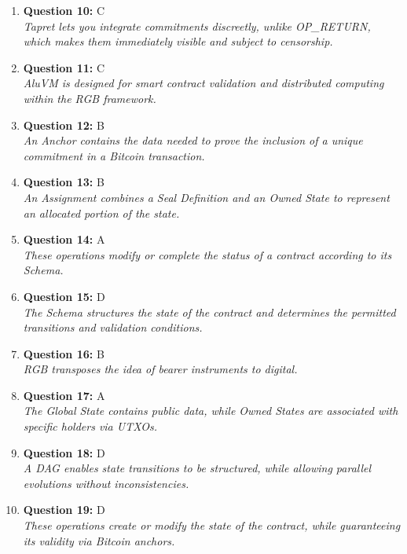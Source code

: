 \documentclass[12pt,a4paper]{article}
\begin{document}
\begin{enumerate}
\item \textbf{Question 10:} C
\\ \textit{Tapret lets you integrate commitments discreetly, unlike OP\_RETURN, which makes them immediately visible and subject to censorship.}

\item \textbf{Question 11:} C
\\ \textit{AluVM is designed for smart contract validation and distributed computing within the RGB framework.}

\item \textbf{Question 12:} B
\\ \textit{An Anchor contains the data needed to prove the inclusion of a unique commitment in a Bitcoin transaction.}

\item \textbf{Question 13:} B
\\ \textit{An Assignment combines a Seal Definition and an Owned State to represent an allocated portion of the state.}

\item \textbf{Question 14:} A
\\ \textit{These operations modify or complete the status of a contract according to its Schema.}

\item \textbf{Question 15:} D
\\ \textit{The Schema structures the state of the contract and determines the permitted transitions and validation conditions.}

\item \textbf{Question 16:} B
\\ \textit{RGB transposes the idea of bearer instruments to digital.}

\item \textbf{Question 17:} A
\\ \textit{The Global State contains public data, while Owned States are associated with specific holders via UTXOs.}

\item \textbf{Question 18:} D
\\ \textit{A DAG enables state transitions to be structured, while allowing parallel evolutions without inconsistencies.}

\item \textbf{Question 19:} D
\\ \textit{These operations create or modify the state of the contract, while guaranteeing its validity via Bitcoin anchors.}


\end{enumerate}
\end{document}

